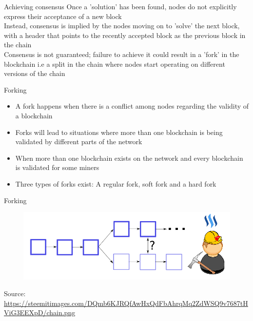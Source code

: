 \documentclass[11pt]{beamer}
\begin{document}

\begin{frame}{Achieving consensus}
	Once a 'solution' has been found, nodes do not explicitly express their acceptance of a new block\\ \vspace{3mm}
	Instead, consensus is implied by the nodes moving on to 'solve' the next block, with a header that points to the recently accepted block as the previous block in the chain\\ \vspace{3mm}
	Consensus is not guaranteed; failure to achieve it could result in a 'fork' in the blockchain i.e a split in the chain where nodes start operating on different versions of the chain
\end{frame}


\begin{frame}{Forking}
	\begin{itemize}
		\item A fork happens when there is a conflict among nodes regarding the validity of a blockchain
		\item Forks will lead to situations where more than one blockchain is being validated by different parts of the network
		\item When more than one blockchain exists on the network and every blockchain is validated for some miners
		\item Three types of forks exist: A regular fork, soft fork and a hard fork
	\end{itemize}
\end{frame}


\begin{frame}{Forking}
	\begin{figure}[]
		\centering
		\includegraphics  [scale=0.1]{Images/fork6}
	\end{figure}
	\begin{tiny}
		Source: \href{https://steemkr.com/blockchain/@rtrader/blockchain-split-soft-vs-hard-fork}{https://steemitimages.com/DQmb6KJRQfAwHxQdFbAhrqMq2ZdWSQ9v7687tHViG3EEXpD/chain.png}
	\end{tiny}
\end{frame}
\end{document}
